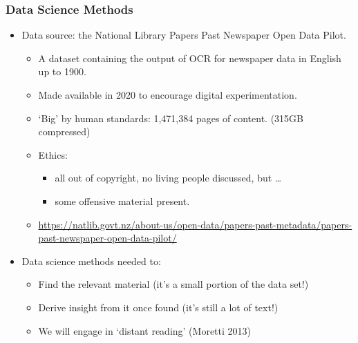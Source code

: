 \documentclass[10pt, compress]{beamer}
\begin{document}
\begin{frame}
	\frametitle{Data Science Methods}

  \pause

  \begin{itemize}[<+- | alert@+>]
		\item Data source: the National Library Papers Past Newspaper Open Data Pilot.
		\begin{itemize}
			\item A dataset containing the output of OCR for newspaper data in English up to 1900.
			\item Made available in 2020 to encourage digital experimentation.
			\item `Big' by human standards: 1,471,384 pages of content. (315GB compressed)
			\item Ethics:
			\begin{itemize}
			\item all out of copyright, no living people discussed, but \ldots
			\item some offensive material present.
		\end{itemize}
			\item \url{https://natlib.govt.nz/about-us/open-data/papers-past-metadata/papers-past-newspaper-open-data-pilot/}
		\end{itemize}
		\item Data science methods needed to:
		\begin{itemize}
			\item Find the relevant material (it's a small portion of the data set!)
			\item Derive insight from it once found (it's still a lot of text!)
			\item We will engage in `distant reading' (Moretti 2013)
		\end{itemize}
	\end{itemize}

\end{frame}
\end{document}
